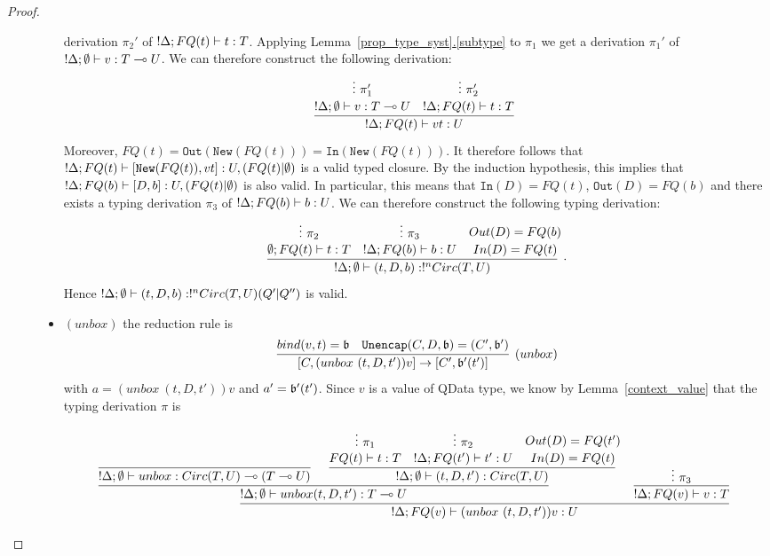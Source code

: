 \documentclass{article}
\begin{document}
\begin{proof}
\begin{description}
\begin{itemize}
  derivation $\pi_2'$ of $!\Delta;FQ(t)\vdash t:T$. 
  Applying Lemma~\hyperref[subtype]{\ref*{prop_type_syst}.\ref*{subtype}}
  to $\pi_1$ we get a derivation $\pi_1'$ of $!\Delta ;\emptyset\vdash v:T\multimap U$.
  We can therefore construct the following derivation:
  \[
  \infer[]{!\Delta;FQ(t)\entails vt : U}{
    \deduce[]{!\Delta ;\emptyset\entails v:T\loli U}{
      \vdots ~\pi_1'
    }
    &
    \deduce[]{!\Delta;FQ(t)\entails t:T}{
      \vdots ~\pi_2'
    }
  }
  \]
  Moreover, $FQ(t)=\mathtt{Out}(\mathtt{New}(FQ(t)))=\mathtt{In}(\mathtt{New}(FQ(t)))$. 
  It therefore follows that $!\Delta;FQ(t)\vdash [\mathtt{New}(FQ(t)),vt]:U,(FQ(t)|\emptyset)$ 
  is a valid typed closure. By the induction hypothesis, this implies that 
  $!\Delta;FQ(b)\vdash [D,b]:U,(FQ(t)|\emptyset)$ is also valid.
  In particular, this means that $\mathtt{In}(D)=FQ(t)$, $\mathtt{Out}(D)=FQ(b)$ 
  and there exists a typing derivation $\pi_3$ of $!\Delta;FQ(b)\vdash b:U$.
  We can therefore construct the following typing derivation:
  \[
  \infer[.]{!\Delta;\emptyset \entails (t,D,b):!^nCirc(T,U)}{
    \deduce[]{\emptyset ; FQ(t)\entails t:T}{
      \vdots~\pi_2
    }
    &
    \deduce[]{!\Delta ; FQ(b)\entails b:U}{
      \vdots~\pi_3
    } 
    &
    \deduce[]{In(D)=FQ(t) }{
      Out(D)=FQ(b)
    }
  }
  \]  
  Hence $!\Delta ;\emptyset \vdash (t,D,b):!^nCirc(T,U) (Q'|Q'')$ is valid.
  \item $(unbox)$ the reduction rule is
  \[
    \infer[(unbox)]{[C,(unbox~(t,D,t'))v]\to [C',\binding'(t')]}{
      bind(v,t)=\binding 
      &
      \mathtt{Unencap}(C,D,\binding) = (C',\binding') 
    }
  \]
  with $a=(unbox~(t,D,t'))v$ and $a'=\mathfrak{b}'(t')$. Since $v$ is a value of 
  QData type, we know by 
  Lemma~\hyperref[context_value]{\ref*{context_value}}
  that the typing derivation $\pi$ is 
  \begin{changemargin}{-4cm}{-2.3cm}
  \[
  \infer[]{!\Delta; FQ(v)\entails (unbox~(t,D,t'))v :U}{
    \infer[]{!\Delta;\emptyset\entails unbox(t,D,t'):T\loli U}{
      \infer[]{!\Delta;\emptyset \entails unbox:Circ(T,U)\loli (T\loli U)}{
      }   
      &
      \infer[]{!\Delta ;\emptyset\entails (t,D,t'):Circ(T,U)}{
        \deduce[]{FQ(t)\entails t:T}{
          \vdots ~\pi_1
        }
        &
        \deduce[]{!\Delta;FQ(t')\entails t':U}{
          \vdots ~\pi_2     
        }
        &
        \deduce[]{In(D)=FQ(t)}{
          Out(D)=FQ(t')
        }
      }
    }
    &
    \infer[]{!\Delta ; FQ(v)\entails v:T}{
      \vdots~\pi_3
    }
  }
  \]
  \end{changemargin}

\end{itemize}
\end{description}
\end{proof}
\end{document}
